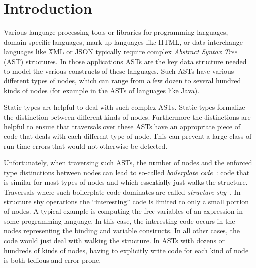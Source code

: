 \section{Introduction}

Various language processing tools or libraries for programming
languages, domain-specific languages, mark-up languages like HTML, or
data-interchange languages like XML or JSON typically require complex
\emph{Abstract Syntax Tree} (AST) structures. In those applications
ASTs are the key data structure needed to model the various constructs
of these languages. Such ASTs have various different types of nodes,
which can range from a few dozen to several hundred kinds of nodes
(for example in the ASTs of languages like Java).

Static types are helpful to deal with such complex ASTs.  Static
types formalize the distinction between different kinds of
nodes. Furthermore the distinctions are helpful to ensure that
traversals over these ASTs have an appropriate piece of code
that deals with each different type of node. This can prevent a large
class of run-time errors that would not otherwise be detected.


Unfortunately, when traversing such ASTs, the number of nodes and the
enforced type distinctions between nodes can lead to so-called
\emph{boilerplate code}~\cite{ralf03syb}: code that is similar for most types of nodes and which
essentially just walks the structure. Traversals where such boilerplate
code dominates are called \emph{structure shy}~\cite{DemeterBook}. In
structure shy operations the ``interesting'' code is limited to only a small portion of nodes.
A typical example is computing the free
variables of an expression in some programming language. In this
case, the interesting code occurs in the nodes representing the
binding and variable constructs. In all other cases, the code would just deal with
walking the structure. In ASTs with dozens or hundreds of
kinds of nodes, having to explicitly write code for each kind of node is both tedious and error-prone.

